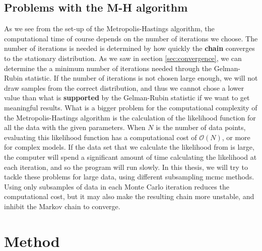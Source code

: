 \documentclass{article}
\theoremstyle{definition}
\begin{document}
\subsection{Problems with the M-H algorithm}
As we see from the set-up of the Metropolis-Hastings algorithm, the computational time of course depends on the number of iterations we choose. The number of iterations is needed is determined by how quickly the \textbf{chain} converges to the stationary distribution. As we saw in section \ref{sec:convergence}, we can determine the a minimum number of iterations needed through the Gelman-Rubin statistic. If the number of iterations is not chosen large enough, we will not draw samples from the correct distribution, and thus we cannot chose a lower value than what is \textbf{supported} by the Gelman-Rubin statistic if we want to get meaningful results. 
What is a bigger problem for the computational complexity of the Metropolis-Hastings algorithm is the calculation of the likelihood function for all the data with the given parameters.
When $N$ is the number of data points, evaluating this likelihood function has a computational cost of  $\mathcal{O}(N)$, or more for complex models. 
If the data set that we calculate the likelihood from is large, the computer will spend a significant amount of time calculating the likelihood at each iteration, and so the program will run slowly. 
In this thesis, we will try to tackle these problems for large data, using different subsampling \gls{mcmc} methods. 
Using only subsamples of data in each Monte Carlo iteration reduces the computational cost, but it may also make the resulting chain more unstable, and inhibit the Markov chain to converge.
\section{Method}
\end{document}
